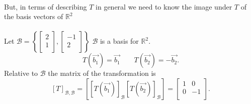 \documentclass{report}
\begin{document}
{

 \\

            But, in terms of describing $ T$ in general we need to know the image under $ T$ of the basis vectors of $ \mathbb{R} ^2$ \\
            \\
            Let $ \mathcal{B} = \left\{  \begin{bmatrix}
            2\\
            1\\
            \end{bmatrix}
            , \begin{bmatrix}
            -1\\
           2\\
            \end{bmatrix}  \right\} $  $ \mathcal{B} $ is a basis for $ \mathbb{R} ^2$.\\
            \[
            T \left(  \vec{ b_1}  \right) = \vec{ b_1}  \qquad  T \left(  \vec{ b_2}  \right) = - \vec{ b_2}
            .\] 
            Relative to $ \mathcal{B}$ the matrix of the transformation is
            \[
            \left[ T \right] _{ \mathcal{B} , \mathcal{B}} = \left[ \left[ T \left(  \vec{ b_1}  \right)  \right] _{ \mathcal{B}} \left[ T \left(  \vec{ b_2}  \right)  \right] _{ \mathcal{B}}  \right] = \begin{bmatrix}
            1 & 0\\
            0 & -1\\
            \end{bmatrix}
            .\] 
    
            \\
            \\
            }
\end{document}
